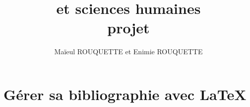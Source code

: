 \documentclass[a4paper,11pt]{book}
\begin{document}
\title{\XeLaTeX et sciences humaines \\ projet}
\author{Maïeul ROUQUETTE et Enimie ROUQUETTE}
\date{}
%

%
%
%
%
%
%
\part{Gérer sa bibliographie avec \LaTeX}

%
%
%
%
%
%

%



\end{document}
